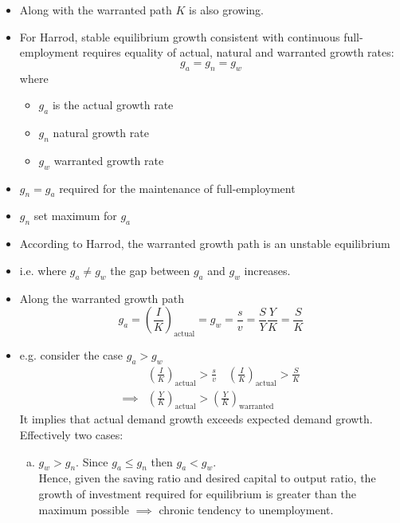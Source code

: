 \documentclass{article}
\begin{document}
\begin{itemize}
		\item Along with the warranted path \( K \) is also growing.
		\item For Harrod, stable equilibrium growth consistent with continuous full-employment requires equality of actual, natural and warranted growth rates:
		\begin{equation}
			g_a = g_n = g_w \label{eq:2.8}
		\end{equation}
		where
		\begin{itemize}
			\item \( g_a \) is the actual growth rate
			\item \( g_n \) natural growth rate
			\item \( g_w \) warranted growth rate
		\end{itemize}
		\item \( g_n = g_a \) required for the maintenance of full-employment
		\item \( g_n \) set maximum for \( g_a \)\\
		\item According to Harrod, the warranted growth path is an unstable equilibrium
		\item i.e. where \( g_a \neq g_w \) the gap between \( g_a \) and \( g_w \) increases.
		\item Along the warranted growth path
		\begin{equation}
			g_a = \left( \frac{I}{K} \right)_{\text{actual}} = g_w = \frac{s}{v} = \frac{S}{Y} \frac{Y}{K} = \frac{S}{K} \label{eq:2.9}
		\end{equation}
		\item e.g. consider the case \( g_a > g_w \) 
		\begin{align*}
			&\left( \frac{I}{K} \right)_{\text{actual}} > \frac{s}{v} \quad \left( \frac{I}{K} \right)_{\text{actual}} > \frac{S}{K} \\ 
			\implies &\left( \frac{Y}{K} \right)_{\text{actual}} > \left( \frac{Y}{K} \right)_{\text{warranted}}
		\end{align*}
		It implies that actual demand growth exceeds expected demand growth.
		Effectively two cases:
		\begin{enumerate}[(a)]
			\item \( g_w > g_n \). Since \( g_a \leq g_n \) then \( g_a < g_w \).\\
				Hence, given the saving ratio and desired capital to output ratio, the growth of investment required for equilibrium is greater than the maximum possible \( \implies \) chronic tendency to unemployment.

\end{enumerate}
\end{itemize}
\end{document}
